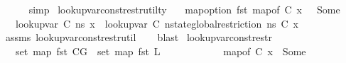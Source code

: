 \begin{isabellebody}
\ \ \ \ \isamarkupfalse%
\ simp\isanewline
{}\isamarkupfalse%
%
\endisatagproof
{\isafoldproof}%
%
\isadelimproof
\isanewline
%
\endisadelimproof
\isanewline
{}\isamarkupfalse%
\ lookup{\isacharunderscore}{\kern0pt}var{\isacharunderscore}{\kern0pt}const{\isacharunderscore}{\kern0pt}restr{\isacharunderscore}{\kern0pt}util{\isacharunderscore}{\kern0pt}ty{\isacharunderscore}{\kern0pt}{}{\isacharcolon}{\kern0pt}\isanewline
\ \ \ {\isachardoublequoteopen}map{\isacharunderscore}{\kern0pt}option\ fst\ {\isacharparenleft}{\kern0pt}map{\isacharunderscore}{\kern0pt}of\ C\ x{\isacharparenright}{\kern0pt}\ {\isacharequal}{\kern0pt}\ \ Some\ {\isasymtau}{\isachardoublequoteclose}\isanewline
\ \ \ {\isachardoublequoteopen}lookup{\isacharunderscore}{\kern0pt}var\ {\isacharparenleft}{\kern0pt}C{\isacharcomma}{\kern0pt}{\isacharbrackleft}{\kern0pt}{\isacharbrackright}{\kern0pt}{\isacharparenright}{\kern0pt}\ ns\ x\ {\isacharequal}{\kern0pt}\ lookup{\isacharunderscore}{\kern0pt}var\ {\isacharparenleft}{\kern0pt}C{\isacharcomma}{\kern0pt}{\isacharbrackleft}{\kern0pt}{\isacharbrackright}{\kern0pt}{\isacharparenright}{\kern0pt}\ {\isacharparenleft}{\kern0pt}nstate{\isacharunderscore}{\kern0pt}global{\isacharunderscore}{\kern0pt}restriction\ ns\ C{\isacharparenright}{\kern0pt}\ x{\isachardoublequoteclose}\isanewline
%
\isadelimproof
\ \ %
\endisadelimproof
%
\isatagproof
{}\isamarkupfalse%
\ assms\ lookup{\isacharunderscore}{\kern0pt}var{\isacharunderscore}{\kern0pt}const{\isacharunderscore}{\kern0pt}restr{\isacharunderscore}{\kern0pt}util{\isacharunderscore}{\kern0pt}{}\isanewline
\ \ \isamarkupfalse%
\ blast%
\endisatagproof
{\isafoldproof}%
%
\isadelimproof
\isanewline
%
\endisadelimproof
\isanewline
{}\isamarkupfalse%
\ lookup{\isacharunderscore}{\kern0pt}var{\isacharunderscore}{\kern0pt}const{\isacharunderscore}{\kern0pt}restr{\isacharcolon}{\kern0pt}\isanewline
\ \ \ {\isachardoublequoteopen}set\ {\isacharparenleft}{\kern0pt}map\ fst\ {\isacharparenleft}{\kern0pt}C{\isacharat}{\kern0pt}G{\isacharparenright}{\kern0pt}{\isacharparenright}{\kern0pt}\ {\isasyminter}\ set\ {\isacharparenleft}{\kern0pt}map\ fst\ L{\isacharparenright}{\kern0pt}\ {\isacharequal}{\kern0pt}\ {\isacharbraceleft}{\kern0pt}{\isacharbraceright}{\kern0pt}{\isachardoublequoteclose}\isanewline
\ \ \ \ \ \ \ \ \ \ {\isachardoublequoteopen}map{\isacharunderscore}{\kern0pt}of\ C\ x\ {\isacharequal}{\kern0pt}\ Some\ {\isasymtau}{\isachardoublequoteclose}\isanewline

\end{isabellebody}

